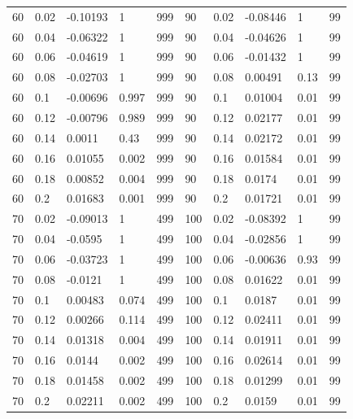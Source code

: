 \documentclass[12pt]{article}
\begin{document}
\begin{spacing}{2.0}
\begin{table}[hb!]
\begin{tabular}{l l | l l | l || ll | ll | l}
            60	&	0.02	&	-0.10193	&	1	&	999	&	90	&	0.02	&	-0.08446	&	1	&	99	\\
            60	&	0.04	&	-0.06322	&	1	&	999	&	90	&	0.04	&	-0.04626	&	1	&	99	\\
            60	&	0.06	&	-0.04619	&	1	&	999	&	90	&	0.06	&	-0.01432	&	1	&	99	\\
            60	&	0.08	&	-0.02703	&	1	&	999	&	90	&	0.08	&	0.00491	&	0.13	&	99	\\
            60	&	0.1	&	-0.00696	&	0.997	&	999	&	90	&	0.1	&	0.01004	&	0.01	&	99	\\
            60	&	0.12	&	-0.00796	&	0.989	&	999	&	90	&	0.12	&	0.02177	&	0.01	&	99	\\
            60	&	0.14	&	0.0011	&	0.43	&	999	&	90	&	0.14	&	0.02172	&	0.01	&	99	\\
            60	&	0.16	&	0.01055	&	0.002	&	999	&	90	&	0.16	&	0.01584	&	0.01	&	99	\\
            60	&	0.18	&	0.00852	&	0.004	&	999	&	90	&	0.18	&	0.0174	&	0.01	&	99	\\
            60	&	0.2	&	0.01683	&	0.001	&	999	&	90	&	0.2	&	0.01721	&	0.01	&	99	\\
            70	&	0.02	&	-0.09013	&	1	&	499	&	100	&	0.02	&	-0.08392	&	1	&	99	\\
            70	&	0.04	&	-0.0595	&	1	&	499	&	100	&	0.04	&	-0.02856	&	1	&	99	\\
            70	&	0.06	&	-0.03723	&	1	&	499	&	100	&	0.06	&	-0.00636	&	0.93	&	99	\\
            70	&	0.08	&	-0.0121	&	1	&	499	&	100	&	0.08	&	0.01622	&	0.01	&	99	\\
            70	&	0.1	&	0.00483	&	0.074	&	499	&	100	&	0.1	&	0.0187	&	0.01	&	99	\\
            70	&	0.12	&	0.00266	&	0.114	&	499	&	100	&	0.12	&	0.02411	&	0.01	&	99	\\
            70	&	0.14	&	0.01318	&	0.004	&	499	&	100	&	0.14	&	0.01911	&	0.01	&	99	\\
            70	&	0.16	&	0.0144	&	0.002	&	499	&	100	&	0.16	&	0.02614	&	0.01	&	99	\\
            70	&	0.18	&	0.01458	&	0.002	&	499	&	100	&	0.18	&	0.01299	&	0.01	&	99	\\
            70	&	0.2	&	0.02211	&	0.002	&	499	&	100	&	0.2	&	0.0159	&	0.01	&	99	\\
			\end{tabular}
			\end{table}
			


\end{spacing}
\end{document}
